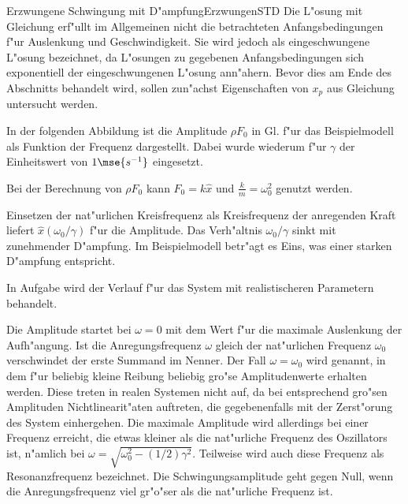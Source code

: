 \begin{MXContent}{Erzwungene Schwingung mit D"ampfung}{Erzwungen}{STD}
Die L"osung mit Gleichung  erf"ullt im Allgemeinen nicht die betrachteten Anfangsbedingungen f"ur Auslenkung und Geschwindigkeit. Sie wird jedoch als eingeschwungene L"osung  bezeichnet, da L"osungen zu gegebenen Anfangsbedingungen sich exponentiell der eingeschwungenen L"osung ann"ahern. Bevor dies am Ende des Abschnitts behandelt wird, sollen zun"achst Eigenschaften von $x_p$ aus Gleichung  untersucht werden.

\begin{MExample}
In der folgenden Abbildung ist die Amplitude $\rho F_0$ in Gl.  f"ur das Beispielmodell als Funktion der Frequenz dargestellt. Dabei wurde wiederum f"ur $\gamma$ der Einheitswert von $1\mse{s^{-1}}$ eingesetzt.

\begin{center}
  \end{center}

Bei der Berechnung von $\rho F_0$ kann $F_0=k\hat{x}$ und $\frac{k}{m}=\omega_0^2$ genutzt werden. 

Einsetzen der nat"urlichen Kreisfrequenz als Kreisfrequenz der anregenden Kraft liefert $\hat{x}(\omega_0/\gamma)$ f"ur die Amplitude. Das Verh"altnis $\omega_0/\gamma$ sinkt mit zunehmender D"ampfung. Im Beispielmodell betr"agt es Eins, was einer starken D"ampfung entspricht. 

\end{MExample}

In Aufgabe 
wird der Verlauf f"ur das System mit realistischeren Parametern behandelt.

Die Amplitude startet bei $\omega=0$ mit dem Wert f"ur die maximale Auslenkung der Aufh"angung. Ist die Anregungsfrequenz $\omega$ gleich der nat"urlichen Frequenz $\omega_0$ verschwindet der erste Summand im Nenner. Der Fall $\omega=\omega_0$ wird  genannt, in dem f"ur beliebig kleine Reibung beliebig gro"se Amplitudenwerte erhalten werden. Diese treten in realen Systemen nicht auf, da bei entsprechend gro"sen Amplituden Nichtlinearit"aten auftreten, die gegebenenfalls mit der Zerst"orung des System einhergehen. Die maximale Amplitude wird allerdings bei einer Frequenz erreicht, die etwas kleiner als die nat"urliche Frequenz des Oszillators ist, n"amlich bei $\omega = \sqrt{\omega_0^2-(1/2)\gamma^2}$. Teilweise wird auch diese Frequenz als Resonanzfrequenz bezeichnet. Die Schwingungsamplitude geht gegen Null, wenn die Anregungsfrequenz viel gr"o"ser als die nat"urliche Frequenz ist.


\end{MXContent}
